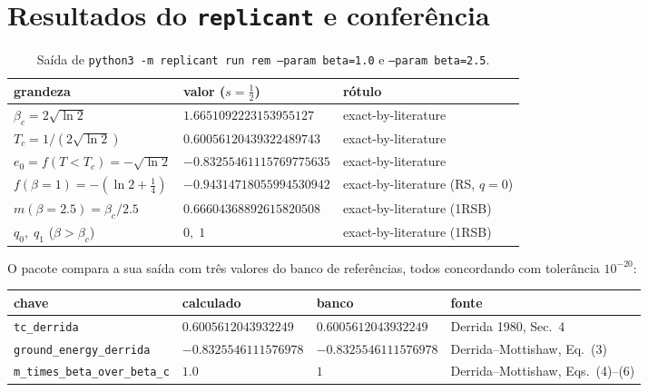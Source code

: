 \documentclass[11pt,a4paper]{article}
\begin{document}
\section{Resultados do \texttt{replicant} e conferência}

\begin{table}[h]
\centering
\begin{tabular}{lll}
\toprule
grandeza & valor ($s=\tfrac12$) & rótulo \\
\midrule
$\beta_c=2\sqrt{\ln2}$ & $1.6651092223153955127$ & exact-by-literature \\
$T_c=1/(2\sqrt{\ln2})$ & $0.60056120439322489743$ & exact-by-literature \\
$e_0=f(T<T_c)=-\sqrt{\ln2}$ & $-0.83255461115769775635$ & exact-by-literature \\
$f(\beta=1)=-(\ln2+\tfrac14)$ & $-0.94314718055994530942$ & exact-by-literature (RS, $q=0$) \\
$m(\beta=2.5)=\beta_c/2.5$ & $0.66604368892615820508$ & exact-by-literature (1RSB) \\
$q_0,\;q_1$ ($\beta>\beta_c$) & $0,\;1$ & exact-by-literature (1RSB) \\
\bottomrule
\end{tabular}
\caption{Saída de \texttt{python3 -m replicant run rem --param beta=1.0} e \texttt{--param beta=2.5}.}
\end{table}

O pacote compara a sua saída com três valores do banco de referências, todos concordando com tolerância
$10^{-20}$:
\begin{center}
\begin{tabular}{llll}
\toprule
chave & calculado & banco & fonte \\
\midrule
\texttt{tc\_derrida} & $0.6005612043932249$ & $0.6005612043932249$ & Derrida 1980, Sec.~4 \\
\texttt{ground\_energy\_derrida} & $-0.8325546111576978$ & $-0.8325546111576978$ & Derrida--Mottishaw, Eq.~(3) \\
\texttt{m\_times\_beta\_over\_beta\_c} & $1.0$ & $1$ & Derrida--Mottishaw, Eqs.~(4)--(6) \\
\bottomrule
\end{tabular}
\end{center}
\end{document}
